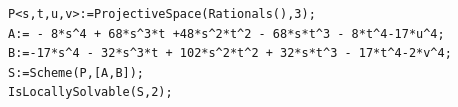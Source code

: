 \documentclass[a4paper,12pt,english,reqno]{amsart}
\begin{document}
\begin{lstlisting}
P<s,t,u,v>:=ProjectiveSpace(Rationals(),3);
A:= - 8*s^4 + 68*s^3*t +48*s^2*t^2 - 68*s*t^3 - 8*t^4-17*u^4;
B:=-17*s^4 - 32*s^3*t + 102*s^2*t^2 + 32*s*t^3 - 17*t^4-2*v^4;
S:=Scheme(P,[A,B]);
IsLocallySolvable(S,2);

\end{lstlisting}
\end{document}
